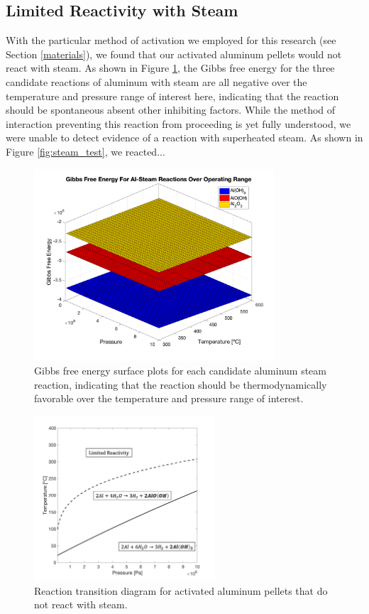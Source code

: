 \documentclass[preprint,12pt,3p]{elsarticle}
\begin{document}
\subsection{Limited Reactivity with Steam}

With the particular method of activation we employed for this research (see
Section \ref{materials}), we found that our activated aluminum pellets would not
react with steam. As shown in Figure \ref{fig:gibbs_steam_surface}, the Gibbs
free energy for the three candidate reactions of aluminum with steam are all
negative over the temperature and pressure range of interest here, indicating
that the reaction should be spontaneous absent other inhibiting factors.  While
the method of interaction preventing this reaction from proceeding is yet fully
understood, we were unable to detect evidence of a reaction with superheated
steam. As shown in Figure \ref{fig:steam_test}, we reacted...

\begin{figure}
  \centering
  \includegraphics[width=0.8\textwidth]{fig/gibbs_steam_total_surface}
  \caption{Gibbs free energy surface plots for each candidate aluminum steam
  reaction, indicating that the reaction should be thermodynamically favorable
over the temperature and pressure range of interest.}
  \label{fig:gibbs_steam_surface}
\end{figure}

\begin{figure}
  \centering
  \includegraphics[width=0.6\textwidth]{fig/transitions_bp}
  \caption{Reaction transition diagram for activated aluminum pellets that do
  not react with steam.}
  \label{fig:transitions_bp}
\end{figure}
\end{document}

